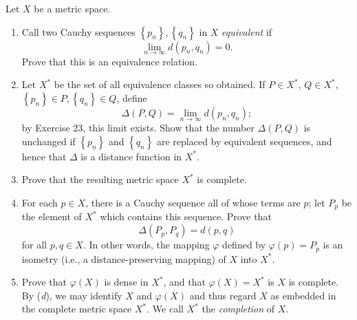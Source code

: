 \documentclass[12pt]{article}
\newenvironment{problem}[2][Exercise]{\begin{trivlist}
\item[\hskip \labelsep {\bfseries #1}\hskip \labelsep {\bfseries #2.}]}{\end{trivlist}}
\begin{document}
\begin{problem}{3.24}
Let $X$ be a metric space.
\begin{enumerate}[label=(\alph*)]
	\item Call two Cauchy sequences $\left\{p_n\right\}, \left\{q_n\right\}$ in $X$ \textit{equivalent} if $$ \lim_{n\rightarrow \infty} d\left(p_n,q_n\right)=0.$$ Prove that this is an equivalence relation.
	\item Let $X^*$ be the set of all equivalence classes so obtained. If $P\in X^*$, $Q\in X^*$, $\left\{p_n\right\}\in P, \left\{q_n\right\}\in Q$, define $$ \Delta \left(P,Q\right) = \lim_{n\rightarrow \infty} d\left(p_n,q_n\right);$$ by Exercise 23, this limit exists. Show that the number $\Delta \left(P,Q\right)$ is unchanged if $\left\{p_n\right\}$ and $\left\{q_n\right\}$ are replaced by equivalent sequences, and hence that $\Delta$ is a distance function in $X^*$.
	\item Prove that the resulting metric space $X^*$ is complete.
	\item For each $p\in X$, there is a Cauchy sequence all of whose terms are $p$; let $P_p$ be the element of $X^*$ which contains this sequence. Prove that $$ \Delta\left(P_p,P_q\right) = d\left(p,q\right)$$ for all $p,q\in X$. In other words, the mapping $\varphi$ defined by $\varphi\left(p\right) = P_p$ is an isometry (i.e., a distance-preserving mapping) of $X$ into $X^*$.
	\item Prove that $\varphi\left(X\right)$ is dense in $X^*$, and that $\varphi\left(X\right)=X^*$ is $X$ is complete. By (\textit{d}), we may identify $X$ and $\varphi\left(X\right)$ and thus regard $X$ as embedded in the complete metric space $X^*$. We call $X^*$ the \textit{completion} of $X$.
\end{enumerate}
\end{problem}
\end{document}
